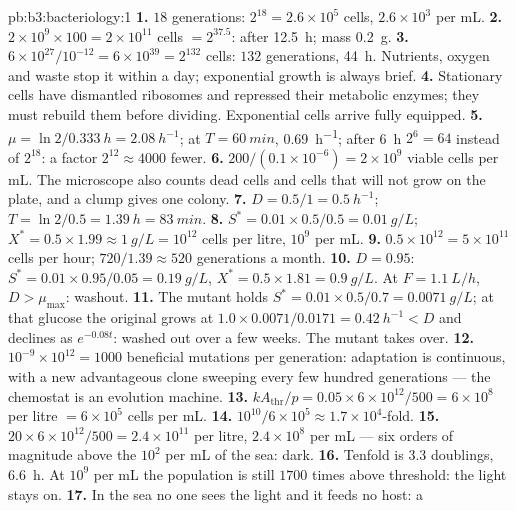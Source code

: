 \begin{solution}{pb:b3:bacteriology:1}
\textbf{1.} $18$ generations: $2^{18} = 2.6\times 10^{5}$ cells,
$2.6\times 10^{3}$ per mL.
\textbf{2.} $2\times 10^{9}\times 100 = 2\times 10^{11}$ cells $=
2^{37.5}$: after \qty{12.5}{h}; mass \qty{0.2}{g}.
\textbf{3.} $6\times 10^{27}/10^{-12} = 6\times 10^{39} = 2^{132}$ cells:
$132$ generations, \qty{44}{h}. Nutrients, oxygen and waste stop it
within a day; exponential growth is always brief.
\textbf{4.} Stationary cells have dismantled ribosomes and repressed
their metabolic enzymes; they must rebuild them before dividing.
Exponential cells arrive fully equipped.
\textbf{5.} $\mu = \ln 2/\qty{0.333}{h} = \qty{2.08}{h^{-1}}$; at $T =
\qty{60}{min}$, \qty{0.69}{h^{-1}}; after \qty{6}{h} $2^{6} = 64$
instead of $2^{18}$: a factor $2^{12} \approx 4000$ fewer.
\textbf{6.} $200/(0.1\times 10^{-6}) = 2\times 10^{9}$ viable cells per
mL. The microscope also counts dead cells and cells that will not grow
on the plate, and a clump gives one colony.
\textbf{7.} $D = 0.5/1 = \qty{0.5}{h^{-1}}$; $T = \ln 2/0.5 =
\qty{1.39}{h} = \qty{83}{min}$.
\textbf{8.} $S^{*} = 0.01\times 0.5/0.5 = \qty{0.01}{g/L}$; $X^{*} =
0.5\times 1.99 \approx \qty{1}{g/L} = 10^{12}$ cells per litre, $10^{9}$
per mL.
\textbf{9.} $0.5\times 10^{12} = 5\times 10^{11}$ cells per hour; $720/1.39
\approx 520$ generations a month.
\textbf{10.} $D = 0.95$: $S^{*} = 0.01\times 0.95/0.05 = \qty{0.19}{g/L}$,
$X^{*} = 0.5\times 1.81 = \qty{0.9}{g/L}$. At $F = \qty{1.1}{L/h}$, $D
> \mu_{\max}$: washout.
\textbf{11.} The mutant holds $S^{*} = 0.01\times 0.5/0.7 = \qty{0.0071}{g/L}$;
at that glucose the original grows at $1.0\times 0.0071/0.0171 =
\qty{0.42}{h^{-1}} < D$ and declines as $e^{-0.08t}$: washed out over a
few weeks. The mutant takes over.
\textbf{12.} $10^{-9}\times 10^{12} = 1000$ beneficial mutations per
generation: adaptation is continuous, with a new advantageous clone
sweeping every few hundred generations --- the chemostat is an
evolution machine.
\textbf{13.} $kA_{\text{thr}}/p = 0.05\times 6\times 10^{12}/500 =
6\times 10^{8}$ per litre $= 6\times 10^{5}$ cells per mL.
\textbf{14.} $10^{10}/6\times 10^{5} \approx 1.7\times 10^{4}$-fold.
\textbf{15.} $20\times 6\times 10^{12}/500 = 2.4\times 10^{11}$ per litre,
$2.4\times 10^{8}$ per mL --- six orders of magnitude above the
$10^{2}$ per mL of the sea: dark.
\textbf{16.} Tenfold is $3.3$ doublings, \qty{6.6}{h}. At $10^{9}$ per mL
the population is still $1700$ times above threshold: the light stays
on.
\textbf{17.} In the sea no one sees the light and it feeds no host: a

\end{solution}
